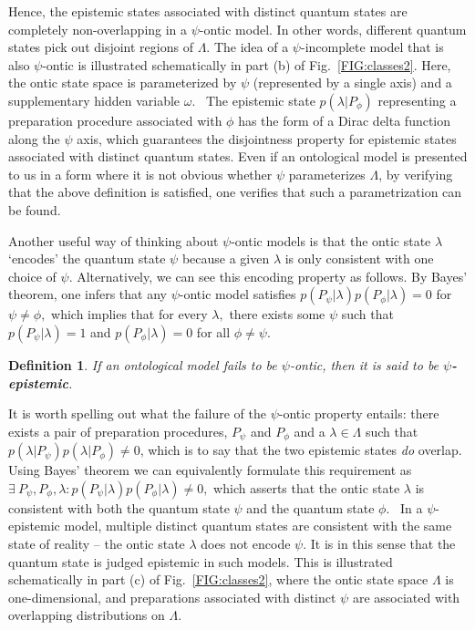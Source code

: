 \documentclass[aps,nofootinbib,12pt]{revtex4}
\newtheorem{definition}[theorem]{Definition}
\begin{document}
Hence, the epistemic states associated with distinct quantum states
are completely non-overlapping in a $\psi$-ontic model. In other
words, different quantum states pick out disjoint regions of
$\Lambda.$ The idea of a $\psi$-incomplete model that is also
$\psi$-ontic is illustrated schematically in part (b) of
Fig.~\ref{FIG:classes2}. Here, the ontic state space is
parameterized by $\psi$ (represented by a single axis) and a
supplementary hidden variable $\omega.$ \ The epistemic state
$p(\lambda|P_{\phi})$ representing a preparation procedure
associated with $\phi$ has the form of a Dirac delta function along
the $\psi$ axis, which guarantees the disjointness property for
epistemic states associated with distinct quantum states. Even if an
ontological model is presented to us in a form where it is not
obvious whether $\psi$ parameterizes $\Lambda$, by verifying that
the above definition is satisfied, one verifies that such a
parametrization can be found.

Another useful way of thinking about $\psi$-ontic models is that the
ontic state $\lambda$ `encodes' the quantum state $\psi$ because a
given $\lambda$ is only consistent with one choice of $\psi$.
Alternatively, we can see this encoding property as follows. By
Bayes' theorem, one infers that any $\psi$-ontic model satisfies
$p(P_{\psi}|\lambda)p(P_{\phi}|\lambda)=0$ for $\psi\neq\phi,$ which
implies that for every $\lambda,$ there exists some $\psi$ such that
$p(P_{\psi}|\lambda)=1$ and $p(P_{\phi}|\lambda)=0$ for all $\phi
\neq\psi.$

\begin{definition}
If an ontological model fails to be $\psi$-ontic, then it is said to
be \textbf{$\psi$-epistemic}.\label{DEF:psi_epistemic}
\end{definition}


It is worth spelling out what the failure of the $\psi$-ontic
property entails: there exists a pair of preparation procedures,
$P_{\psi}$ and ${P}_{\phi}$ and a $\lambda\in\Lambda$ such that
$p\left( \lambda|P_{\psi }\right) p\left( \lambda|P_{\phi}\right)
\neq{0}$, which is to say that the two epistemic states \emph{do
}overlap. Using Bayes' theorem we can equivalently formulate this
requirement as $\exists\:{P}_{\psi},{P}_{\phi },\lambda:p\left(
P_{\psi}|\lambda\right)  p\left(  P_{\phi}|\lambda\right) \neq{0},$
which asserts that the ontic state $\lambda$ is consistent with both
the quantum state $\psi$ and the quantum state $\phi.$ \ In a
$\psi$-epistemic model, multiple distinct quantum states are
consistent with the same state of reality -- the ontic state
$\lambda$ does not encode $\psi.$ It is in this sense that the
quantum state is judged epistemic in such models. This is
illustrated schematically in part (c) of Fig.~\ref{FIG:classes2},
where the ontic state space $\Lambda$ is one-dimensional, and
preparations associated with distinct $\psi$ are associated with
overlapping distributions on $\Lambda.$
\end{document}
